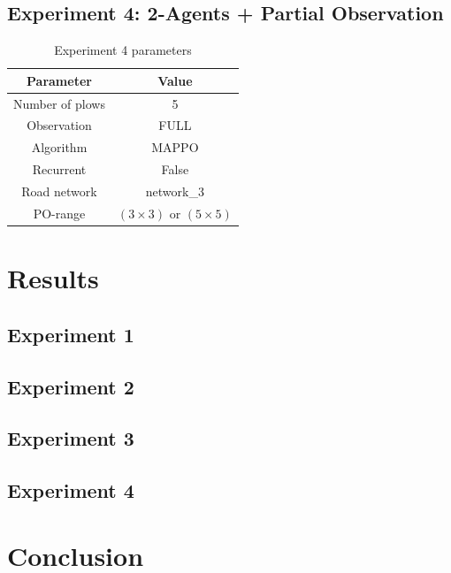 \documentclass{scrartcl}
\theoremstyle{mytheoremstyle}
\theoremstyle{mytheoremstyle}
\theoremstyle{myproblemstyle}
\begin{document}
\subsection{Experiment 4: 2-Agents + Partial Observation}
\begin{table}[H]
    \centering
    \begin{tabular}{|c|c|}
        \hline
        \textbf{Parameter} & \textbf{Value}                   \\\hline
        Number of plows    & 5                                \\\hline
        Observation        & FULL                             \\\hline
        Algorithm          & MAPPO                            \\\hline
        Recurrent          & False                            \\\hline
        Road network       & network\_3                       \\\hline
        PO-range           & $(3 \times 3)$ or $(5 \times 5)$ \\\hline
    \end{tabular}
    \caption{Experiment 4 parameters}
    \label{tab:exp4}
\end{table}


\section{Results}

\subsection{Experiment 1}

\subsection{Experiment 2}

\subsection{Experiment 3}

\subsection{Experiment 4}

\section{Conclusion}
\end{document}
